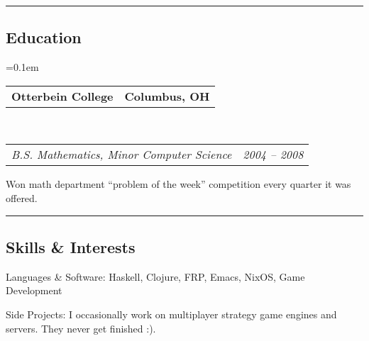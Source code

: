\documentclass[10pt,letterpaper]{article}
\makeatletter
\newenvironment{indentsection}[1]%
{\begin{list}{}%
	{\setlength{\leftmargin}{#1}}%
	\item[]%
}
{\end{list}}
\newcommand{\headerrow}[2]
{\begin{tabular*}{\linewidth}{l@{\extracolsep{\fill}}r}
	#1 &
	#2 \\
\end{tabular*}}
\makeatother
\begin{document}
\hrule
\vspace{-0.4em}
\subsection*{Education}

	\parskip=0.1em


	\headerrow
		{\textbf{Otterbein College}}
		{\textbf{Columbus, OH}}
	\\
	\headerrow
		{\emph{B.S. Mathematics, Minor Computer Science}}
		{\emph{2004 -- 2008}}
	\begin{itemize*}
		\item Won math department ``problem of the week'' competition every quarter it was offered.
	\end{itemize*}




\hrule
\vspace{-0.4em}
\subsection*{Skills \& Interests}

\begin{indentsection}{\parindent}
\begin{description*}
\item[Languages \& Software:]
  Haskell, Clojure, FRP, Emacs, NixOS, Game Development
\item[Side Projects:] I occasionally work on multiplayer strategy game engines and servers.  They never get finished :).
\end{description*}
\end{indentsection}
\end{document}
